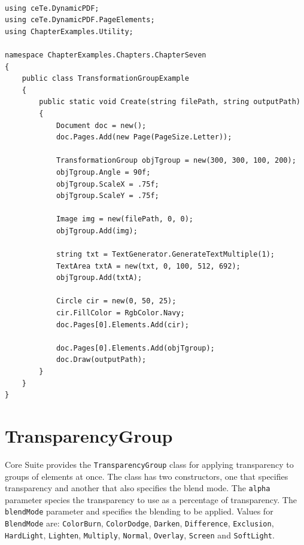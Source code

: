 \documentclass[american,letterpaper]{tufte-book}
\numberwithin{equation}{section}
\numberwithin{figure}{section}
\begin{document}
{\bgroup{}
\begin{lstlisting}[caption={Applying a TransformationGroup.},label={lis:Applying-a-TransformationGroup},basicstyle={\small\ttfamily},breaklines=true]

using ceTe.DynamicPDF;
using ceTe.DynamicPDF.PageElements;
using ChapterExamples.Utility;

namespace ChapterExamples.Chapters.ChapterSeven
{
    public class TransformationGroupExample
    {
        public static void Create(string filePath, string outputPath)
        {
            Document doc = new();
            doc.Pages.Add(new Page(PageSize.Letter));

            TransformationGroup objTgroup = new(300, 300, 100, 200);
            objTgroup.Angle = 90f;
            objTgroup.ScaleX = .75f;
            objTgroup.ScaleY = .75f;

            Image img = new(filePath, 0, 0);
            objTgroup.Add(img);

            string txt = TextGenerator.GenerateTextMultiple(1);
            TextArea txtA = new(txt, 0, 100, 512, 692);
            objTgroup.Add(txtA);

            Circle cir = new(0, 50, 25);
            cir.FillColor = RgbColor.Navy;
            doc.Pages[0].Elements.Add(cir);

            doc.Pages[0].Elements.Add(objTgroup);
            doc.Draw(outputPath);
        }
    }
}
\end{lstlisting}
\leavevmode\egroup


\section{TransparencyGroup}\label{subsec:TransparencyGroup}

Core Suite provides the \texttt{TransparencyGroup} class for applying
transparency to groups of elements at once. The class has two constructors,
one that specifies transparency and another that also specifies the
blend mode. The \texttt{alpha} parameter species the transparency
to use as a percentage of transparency. The \texttt{blendMode} parameter
and specifies the blending to be applied. Values for \texttt{BlendMode}
are: \texttt{ColorBurn}, \texttt{ColorDodge}, \texttt{Darken}, \texttt{Difference},
\texttt{Exclusion}, \texttt{HardLight}, \texttt{Lighten}, \texttt{Multiply},
\texttt{Normal}, \texttt{Overlay}, \texttt{Screen} and \texttt{SoftLight}.

}
\end{document}
